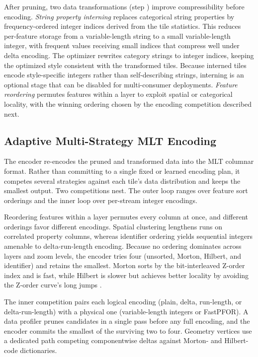 After pruning, two data transformations (step ) improve compressibility before encoding.
\emph{String property interning} replaces categorical string properties by frequency-ordered integer indices derived from the tile statistics.
This reduces per-feature storage from a variable-length string to a small variable-length integer, with frequent values receiving small indices that compress well under delta encoding.
The optimizer rewrites category strings to integer indices, keeping the optimized style consistent with the transformed tiles.
Because interned tiles encode style-specific integers rather than self-describing strings, interning is an optional stage that can be disabled for multi-consumer deployments.
\emph{Feature reordering} permutes features within a layer to exploit spatial or categorical locality, with the winning ordering chosen by the encoding competition described next.

\subsection{Adaptive Multi-Strategy MLT Encoding}\label{sec:methods:encoding}

The encoder re-encodes the pruned and transformed data into the \ac{MLT} columnar format.
Rather than committing to a single fixed or learned encoding plan, it competes several strategies against each tile's data distribution and keeps the smallest output.
Two competitions nest.
The outer loop ranges over feature sort orderings and the inner loop over per-stream integer encodings.

Reordering features within a layer permutes every column at once, and different orderings favor different encodings.
Spatial clustering lengthens runs on correlated property columns, whereas identifier ordering yields sequential integers amenable to delta-run-length encoding.
Because no ordering dominates across layers and zoom levels, the encoder tries four (unsorted, Morton, Hilbert, and identifier) and retains the smallest.
Morton sorts by the bit-interleaved Z-order index and is fast, while Hilbert is slower but achieves better locality by avoiding the Z-order curve's long jumps \citep{moonAnalysisClusteringProperties2001}.

The inner competition pairs each logical encoding (plain, delta, run-length, or delta-run-length) with a physical one (variable-length integers or FastPFOR).
A data profiler prunes candidates in a single pass before any full encoding, and the encoder commits the smallest of the surviving two to four.
Geometry vertices use a dedicated path competing componentwise deltas against Morton- and Hilbert-code dictionaries.


